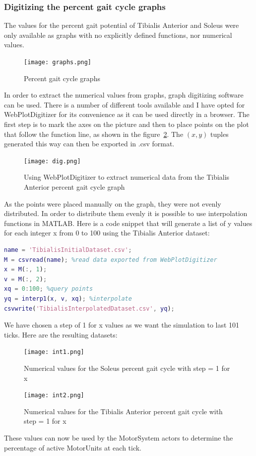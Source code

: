 \documentclass[titlepage]{article}
\begin{document}
\subsubsection{Digitizing the percent gait cycle graphs}
The values for the percent gait potential of Tibialis Anterior and Soleus were only available as graphs with no explicitly defined functions, nor numerical values. 
\begin{figure}[H]
  \centering
	\texttt{[image: graphs.png]}
	\caption{Percent gait cycle graphs}
  \label{fig:graphs}
\end{figure}
In order to extract the numerical values from graphs, graph digitizing software can be used. There is a number of different tools available and I have opted for WebPlotDigitizer for its convenience as it can be used directly in a browser. The first step is to mark the axes on the picture and then to place points on the plot that follow the function line, as shown in the figure~\ref{fig:dig}. The $(x, y)$ tuples generated this way can then be exported in .csv format.
\begin{figure}[H]
  \centering
	\texttt{[image: dig.png]}
	\caption{Using WebPlotDigitizer to extract numerical data from the Tibialis Anterior percent gait cycle graph}
  \label{fig:dig}
\end{figure}
As the points were placed manually on the graph, they were not evenly distributed. In order to distribute them evenly it is possible to use interpolation functions in MATLAB. Here is a code snippet that will generate a list of y values for each integer x from 0 to 100 using the Tibialis Anterior dataset:
\begin{lstlisting}[language=MATLAB]
name = 'TibialisInitialDataset.csv';
M = csvread(name); %read data exported from WebPlotDigitizer
x = M(:, 1);
v = M(:, 2);
xq = 0:100; %query points
yq = interp1(x, v, xq); %interpolate
csvwrite('TibialisInterpolatedDataset.csv', yq);
\end{lstlisting}
We have chosen a step of 1 for x values as we want the simulation to last 101 ticks. Here are the resulting datasets:
\begin{figure}[H]
  \centering
	\texttt{[image: int1.png]}
	\caption{Numerical values for the Soleus percent gait cycle with step = 1 for x}
  \label{fig:int1}
\end{figure}
\begin{figure}[H]
  \centering
	\texttt{[image: int2.png]}
	\caption{Numerical values for the Tibialis Anterior percent gait cycle with step = 1 for x}
  \label{fig:int2}
\end{figure}
These values can now be used by the MotorSystem actors to determine the percentage of active MotorUnits at each tick.
\end{document}

